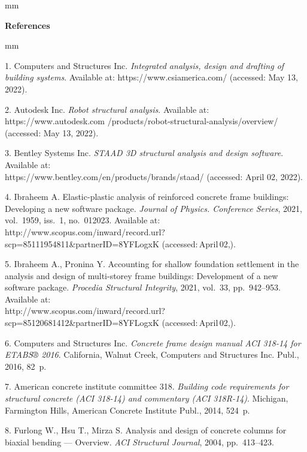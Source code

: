

{\small



 mm

\noindent \textbf{References} }

 mm

{\footnotesize



1. Computers and Structures Inc. \textit{Integrated analysis, design and drafting of building systems}. Available at: https://www.csiamerica.com/ (accessed: May 13, 2022).

2. Autodesk Inc. \textit{Robot structural analysis}. Available at:\\ https://www.autodesk.com
/products/robot-structural-analysis/overview/ (accessed: May 13, 2022).

3. Bentley Systems Inc. \textit{STAAD 3D structural analysis and design software}. Available at:\\ https://www.bentley.com/en/products/brands/staad/ (accessed: April 02, 2022).

4. Ibraheem A. Elastic-plastic analysis of reinforced concrete frame buildings: Developing a new software package. \textit{Journal of Physics. Conference Series}, 2021, vol.~1959, iss.~1, no.~012023. Available at: http://www.scopus.com/inward/record.url?scp=85111954811\&partnerID=8YFLogxK (accessed:\,April\,02,).

5. Ibraheem A., Pronina Y. Accounting for shallow foundation settlement in the analysis and design of multi-storey frame buildings: Development of a new software package. \textit{Procedia Structural Integrity}, 2021, vol.~33, pp.~942--953. Available at:\\ http://www.scopus.com/inward/record.url?scp=85120681412\&partnerID=8YFLogxK (accessed:\,April\,02,).

6. Computers and Structures Inc. \textit{Concrete frame design manual ACI 318-14 for ETABS® 2016}. California, Walnut Creek, Computers and Structures Inc. Publ., 2016, 82~p.

7. American concrete institute committee 318. \textit{Building code requirements for structural concrete (ACI 318-14) and commentary (ACI 318R-14)}. Michigan, Farmington Hills, American Concrete Institute Publ., 2014, 524~p.

8. Furlong W., Hsu T., Mirza S. Analysis and design of concrete columns for biaxial bending --- Overview. \textit{ACI Structural Journal}, 2004, pp.~413--423.

}
